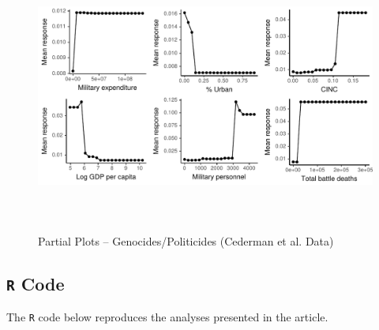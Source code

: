 \documentclass[a4paper,12pt]{article}
\begin{document}
\begin{figure}[H]
    \centering
    \includegraphics[width=\textwidth, height=9cm]{images/drfdpp7a.pdf}
    \caption{Partial Plots -- Genocides/Politicides (Cederman et al. Data)}
    \label{fig:my_label}
\end{figure}

\newpage

\subsection{\texttt{R} Code}
\label{sec:mk-code}

The \texttt{R} code below reproduces the analyses presented in the article.
\end{document}
